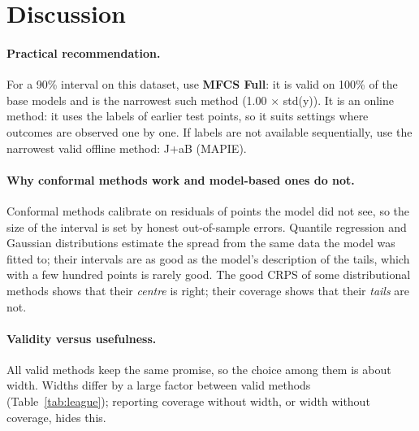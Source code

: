 \documentclass[11pt]{article}
\begin{document}
\FloatBarrier
\section{Discussion}\label{sec:discussion}
\paragraph{Practical recommendation.} For a 90\% interval on this dataset, use \textbf{MFCS Full}: it is valid on 100\% of the base models and is the narrowest such method (1.00 $\times$ std(y)). It is an online method: it uses the labels of earlier test points, so it suits settings where outcomes are observed one by one. If labels are not available sequentially, use the narrowest valid offline method: J+aB (MAPIE).
\paragraph{Why conformal methods work and model-based ones do not.} Conformal methods calibrate on residuals of points the model did not
see, so the size of the interval is set by honest out-of-sample errors. Quantile regression and Gaussian distributions estimate the spread
from the same data the model was fitted to; their intervals are as good as the model's description of the tails, which with a few hundred
points is rarely good. The good CRPS of some distributional methods shows that their \emph{centre} is right; their coverage shows that their
\emph{tails} are not.
\paragraph{Validity versus usefulness.} All valid methods keep the same promise, so the choice among them is about width. Widths differ by
a large factor between valid methods (Table~\ref{tab:league}); reporting coverage without width, or width without coverage, hides this.
\end{document}
